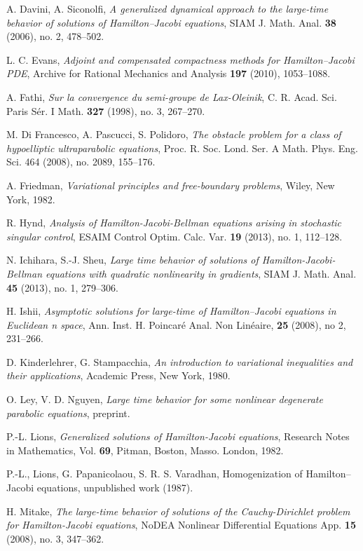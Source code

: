 \documentclass[12pt,reqno]{amsart}
\theoremstyle{plain}
\theoremstyle{remark}
\numberwithin{equation}{section}
\begin{document}
\begin{thebibliography}{30}
A. Davini, A. Siconolfi, 
\emph{A generalized dynamical approach to the large-time behavior of solutions of Hamilton--Jacobi equations}, 
SIAM J. Math. Anal. {\bf 38} (2006), no. 2, 478--502.  

L. C. Evans,
\emph{Adjoint and compensated compactness methods for Hamilton--Jacobi PDE}, 
Archive for Rational Mechanics and Analysis {\bf 197} (2010), 1053--1088.

A. Fathi, 
\emph{Sur la convergence du semi-groupe de Lax-Oleinik}, 
C. R. Acad. Sci. Paris S\'er. I Math. {\bf 327} (1998), no. 3, 267--270.

M. Di Francesco, A. Pascucci, S. Polidoro, 
\emph{The obstacle problem for a class of hypoelliptic ultraparabolic equations}, 
Proc. R. Soc. Lond. Ser. A Math. Phys. Eng. Sci. 464 (2008), no. 2089, 155--176.

A. Friedman, 
\emph{Variational principles and free-boundary problems}, 
Wiley, New York, 1982.

R. Hynd, 
\emph{Analysis of Hamilton-Jacobi-Bellman equations arising in stochastic singular control},
 ESAIM Control Optim. Calc. Var. {\bf 19} (2013), no. 1, 112--128. 

N. Ichihara, S.-J. Sheu, 
\emph{Large time behavior of solutions of Hamilton-Jacobi-Bellman equations with quadratic nonlinearity in gradients}, 
SIAM J. Math. Anal. {\bf45} (2013), no. 1, 279--306.

H. Ishii, 
\emph{Asymptotic solutions for large-time of Hamilton--Jacobi equations in Euclidean n space}, 
Ann. Inst. H. Poincar\'e Anal. Non Lin\'eaire, {\bf25} (2008), no 2, 231--266. 

D. Kinderlehrer, G. Stampacchia, 
\emph{An introduction to variational inequalities and their applications},
 Academic Press, New York, 1980.

O. Ley, V. D. Nguyen, 
\emph{Large time behavior for some nonlinear degenerate parabolic equations}, 
preprint.  

P.-L. Lions, 
\emph{Generalized solutions of Hamilton-Jacobi equations}, 
Research Notes in Mathematics, Vol. {\bf 69}, 
Pitman, Boston, Masso. London, 1982.

P.-L., Lions, G. Papanicolaou, S. R. S. Varadhan,  
Homogenization of Hamilton--Jacobi equations, 
unpublished work (1987). 

H. Mitake, 
\emph{The large-time behavior of solutions of the Cauchy-Dirichlet 
problem for Hamilton-Jacobi equations}, 
NoDEA Nonlinear Differential Equations App. {\bf 15} (2008), 
no. 3, 347--362. 


\end{thebibliography}
\end{document}
